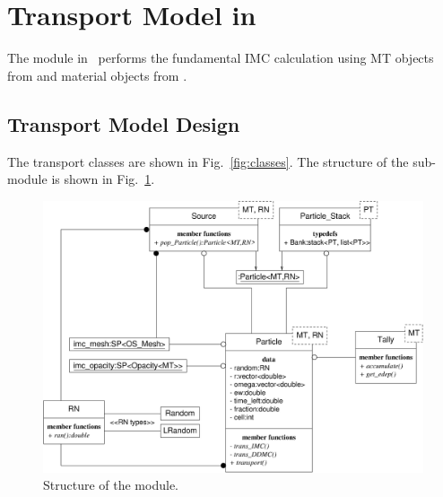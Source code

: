 
\section{Transport Model in }

The  module in \imctest\ performs the fundamental IMC 
calculation using MT objects from  and material
objects from .  

\subsection{Transport Model Design}

The transport classes are shown in Fig.~\ref{fig:classes}.  The
structure of the  sub-module is shown in
Fig.~\ref{fig:trans}.
\begin{figure}
  \centerline{
    \includegraphics[width=6in]{trans.eps}}
  \caption{Structure of the  module.}
  \label{fig:trans}
\end{figure}
